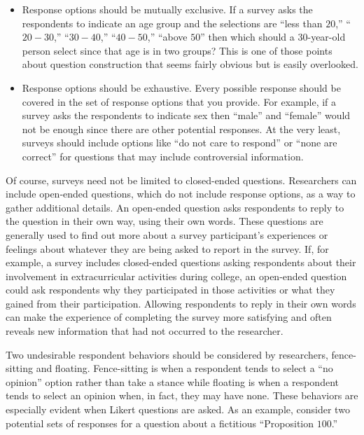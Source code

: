 \begin{itemize}
	\item Response options should be mutually exclusive. If a survey asks the respondents to indicate an age group and the selections are ``less than $ 20 $,'' ``$ 20-30 $,'' ``$ 30-40 $,'' ``$ 40-50 $,'' ``above $ 50 $'' then which should a $ 30 $-year-old person select since that age is in two groups? This is one of those points about question construction that seems fairly obvious but is easily overlooked. 

	\item Response options should be exhaustive. Every possible response should be covered in the set of response options that you provide. For example, if a survey asks the respondents to indicate sex then ``male'' and ``female'' would not be enough since there are other potential responses. At the very least, surveys should include options like ``do not care to respond'' or ``none are correct'' for questions that may include controversial information.
\end{itemize}

Of course, surveys need not be limited to closed-ended questions. Researchers can include open-ended questions, which do not include response options, as a way to gather additional details. An open-ended question asks respondents to reply to the question in their own way, using their own words. These questions are generally used to find out more about a survey participant's experiences or feelings about whatever they are being asked to report in the survey. If, for example, a survey includes closed-ended questions asking respondents about their involvement in extracurricular activities during college, an open-ended question could ask respondents why they participated in those activities or what they gained from their participation. Allowing respondents to reply in their own words can make the experience of completing the survey more satisfying and often reveals new information that had not occurred to the researcher.

Two undesirable respondent behaviors should be considered by researchers, fence-sitting and floating. Fence-sitting is when a respondent tends to select a ``no opinion'' option rather than take a stance while floating is when a respondent tends to select an opinion when, in fact, they may have none. These behaviors are especially evident when Likert questions are asked. As an example, consider two potential sets of responses for a question about a fictitious ``Proposition $ 100 $.''

